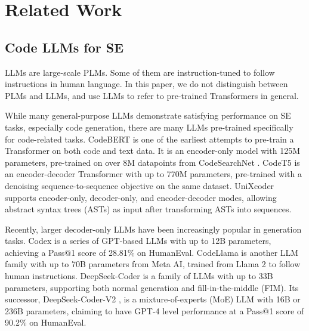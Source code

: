 \section{Related Work\label{literature}}
\subsection{Code LLMs for SE}
LLMs are large-scale PLMs. Some of them are instruction-tuned to follow instructions in human language. In this paper, we do not distinguish between PLMs and LLMs, and use LLMs to refer to pre-trained Transformers \cite{DBLP:conf/nips/VaswaniSPUJGKP17} in general.

While many general-purpose LLMs demonstrate satisfying performance on SE tasks, especially code generation, there are many LLMs pre-trained specifically for code-related tasks. CodeBERT \cite{DBLP:conf/emnlp/FengGTDFGS0LJZ20} is one of the earliest attempts to pre-train a Transformer on both code and text data. It is an encoder-only model with 125M parameters, pre-trained on over 8M datapoints from CodeSearchNet \cite{DBLP:journals/corr/abs-1909-09436}. CodeT5 \cite{DBLP:conf/emnlp/0034WJH21} is an encoder-decoder Transformer with up to 770M parameters, pre-trained with a denoising sequence-to-sequence objective on the same dataset. 
UniXcoder \cite{DBLP:conf/acl/GuoLDW0022} supports encoder-only, decoder-only, and encoder-decoder modes, allowing abstract syntax trees (ASTs) as input after transforming ASTs into sequences.

Recently, larger decoder-only LLMs have been increasingly popular in generation tasks. Codex \cite{DBLP:journals/corr/abs-2107-03374} is a series of GPT-based LLMs with up to 12B parameters, achieving a Pass@1 score of 28.81\% on HumanEval. CodeLlama \cite{DBLP:journals/corr/abs-2308-12950} is another LLM family with up to 70B parameters from Meta AI, trained from Llama 2 \cite{DBLP:journals/corr/abs-2307-09288} to follow human instructions. %
DeepSeek-Coder \cite{DBLP:journals/corr/abs-2401-14196} is a family of LLMs with up to 33B parameters, supporting both normal generation and fill-in-the-middle (FIM). Its successor, DeepSeek-Coder-V2 \cite{DBLP:journals/corr/abs-2406-11931}, is a mixture-of-experts (MoE) LLM with 16B or 236B parameters, claiming to have GPT-4 \cite{DBLP:journals/corr/abs-2303-08774} level performance at a Pass@1 score of 90.2\% on HumanEval.


